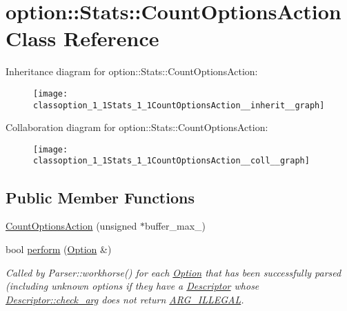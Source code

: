\hypertarget{classoption_1_1Stats_1_1CountOptionsAction}{}\section{option\+:\+:Stats\+:\+:Count\+Options\+Action Class Reference}
\label{classoption_1_1Stats_1_1CountOptionsAction}


Inheritance diagram for option\+:\+:Stats\+:\+:Count\+Options\+Action\+:
\nopagebreak
\begin{figure}[H]
\begin{center}
\leavevmode
\texttt{[image: classoption\_1\_1Stats\_1\_1CountOptionsAction\_\_inherit\_\_graph]}
\end{center}
\end{figure}


Collaboration diagram for option\+:\+:Stats\+:\+:Count\+Options\+Action\+:
\nopagebreak
\begin{figure}[H]
\begin{center}
\leavevmode
\texttt{[image: classoption\_1\_1Stats\_1\_1CountOptionsAction\_\_coll\_\_graph]}
\end{center}
\end{figure}
\subsection*{Public Member Functions}
\begin{DoxyCompactItemize}
\item 
\hyperlink{classoption_1_1Stats_1_1CountOptionsAction_a24a38b87ad129b0e12660bd2019ba284}{Count\+Options\+Action} (unsigned $\ast$buffer\+\_\+max\+\_\+)
\item 
bool \hyperlink{classoption_1_1Stats_1_1CountOptionsAction_a29ab8a68d0a30736b99b4d2e5dece489}{perform} (\hyperlink{classoption_1_1Option}{Option} \&)
\begin{DoxyCompactList}\small\item\em Called by Parser\+::workhorse() for each \hyperlink{classoption_1_1Option}{Option} that has been successfully parsed (including unknown options if they have a \hyperlink{structoption_1_1Descriptor}{Descriptor} whose \hyperlink{structoption_1_1Descriptor_aa5d675dba0214a4abd73007ff163cc67}{Descriptor\+::check\+\_\+arg} does not return \hyperlink{namespaceoption_aee8c76a07877335762631491e7a5a1a9a9528e32563b795bd2930b12d0a5e382d}{A\+R\+G\+\_\+\+I\+L\+L\+E\+G\+AL}. \end{DoxyCompactList}\end{DoxyCompactItemize}


